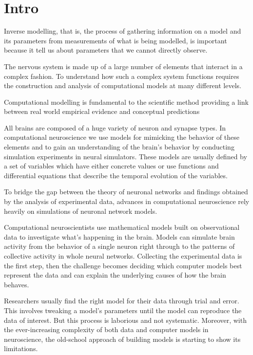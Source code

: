 

\section{Intro}

Inverse modelling, that is, the process of gathering information on a model and its parameters from measurements of what is being modelled, is important because it tell us about parameters that we cannot directly observe.



The nervous system is made up of a large number of elements that interact in a complex fashion. To understand how such a complex system functions requires the construction and analysis of computational models at many different levels. 


Computational modelling is fundamental to the scientific method providing a link between real world empirical evidence and conceptual predictions

All brains are composed of a huge variety of neuron and synapse types. In computational neuroscience we use models for mimicking the behavior of these elements and to gain an understanding of the brain's behavior by conducting simulation experiments in neural simulators. These models are usually defined by a set of variables which have either concrete values or use functions and differential equations that describe the temporal evolution of the variables.

 

To bridge the gap between the theory of neuronal networks and findings obtained by the analysis of experimental data, advances in computational neuroscience rely heavily on simulations of neuronal network models. 


Computational neuroscientists use mathematical models built on observational data to investigate what’s happening in the brain. Models can simulate brain activity from the behavior of a single neuron right through to the patterns of collective activity in whole neural networks. Collecting the experimental data is the first step, then the challenge becomes deciding which computer models best represent the data and can explain the underlying causes of how the brain behaves.

Researchers usually find the right model for their data through trial and error. This involves tweaking a model’s parameters until the model can reproduce the data of interest. But this process is laborious and not systematic. Moreover, with the ever-increasing complexity of both data and computer models in neuroscience, the old-school approach of building models is starting to show its limitations.

